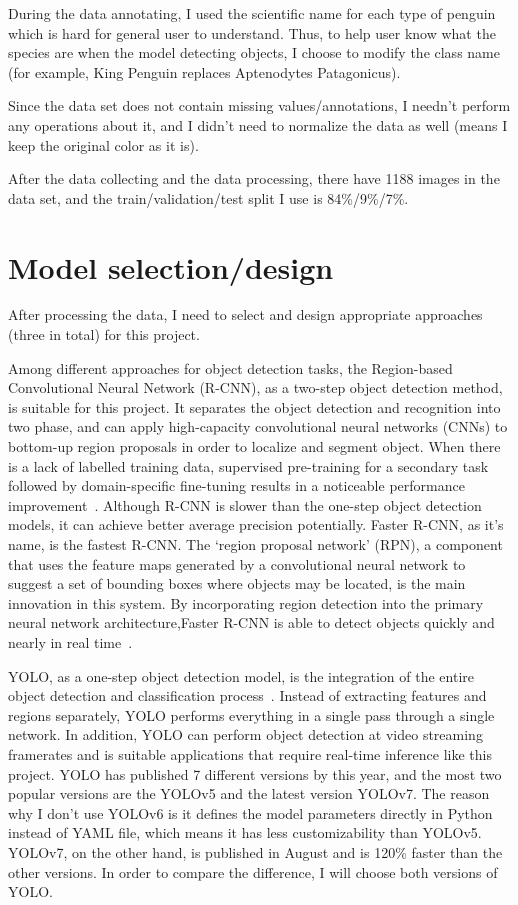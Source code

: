 \documentclass[runningheads]{llncs}
\begin{document}
During the data annotating, I used the scientific name for each type of penguin which is hard for general user to understand. Thus, to help user know what the species are when the model detecting objects, I choose to modify the class name (for example, King Penguin replaces Aptenodytes Patagonicus).

Since the data set does not contain missing values/annotations, I needn't perform any operations about it, and I didn't need to normalize the data as well (means I keep the original color as it is). 

After the data collecting and the data processing, there have 1188 images in the data set, and the train/validation/test split I use is 84\%/9\%/7\%. 


\section{Model selection/design}
After processing the data, I need to select and design appropriate approaches (three in total) for this project. 

Among different approaches for object detection tasks, the Region-based Convolutional Neural Network (R-CNN), as a two-step object detection method, is suitable for this project. It separates the object detection and recognition into two phase, and can apply high-capacity convolutional neural networks (CNNs) to bottom-up region proposals in order to localize and segment object. When there is a lack of labelled training data, supervised pre-training for a secondary task followed by domain-specific fine-tuning results in a noticeable performance improvement~\cite{R-CNN}. Although R-CNN is slower than the one-step object detection models, it can achieve better average precision potentially. Faster R-CNN, as it's name, is the fastest R-CNN. The `region proposal network' (RPN), a component that uses the feature maps generated by a convolutional neural network to suggest a set of bounding boxes where objects may be located, is the main innovation in this system. By incorporating region detection into the primary neural network architecture,Faster R-CNN is able to detect objects quickly and nearly in real time~\cite{Faster R-CNN}.

YOLO, as a one-step object detection model, is the integration of the entire object detection and classification process~\cite{YOLO}. Instead of extracting features and regions separately, YOLO performs everything in a single pass through a single network. In addition, YOLO can perform object detection at video streaming framerates and is suitable applications that require real-time inference like this project. YOLO has published 7 different versions by this year, and the most two popular versions are the YOLOv5 and the latest version YOLOv7. The reason why I don't use YOLOv6 is it defines the model parameters directly in Python instead of YAML file, which means it has less customizability than YOLOv5. YOLOv7, on the other hand, is published in August and is 120\% faster than the other versions. In order to compare the difference, I will choose both versions of YOLO. 
\end{document}
